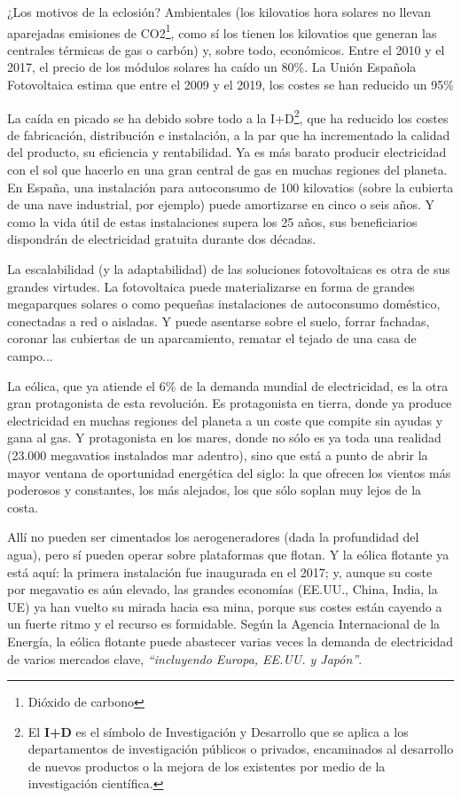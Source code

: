 \documentclass[12pt,letterpaper,superscriptaddress]{article}
\begin{document}
¿Los motivos de la eclosión? Ambientales (los kilovatios hora solares no llevan aparejadas emisiones de CO2\footnote{Dióxido de carbono}, como sí los tienen los kilovatios que generan las centrales térmicas de gas o carbón) y, sobre todo, económicos. Entre el 2010 y el 2017, el precio de los módulos solares ha caído un 80\%. La Unión Española Fotovoltaica estima que entre el 2009 y el 2019, los costes se han reducido un 95\%

La caída en picado se ha debido sobre todo a la I+D\footnote{El \textbf{I+D} es el símbolo de Investigación y Desarrollo que se aplica a los departamentos de investigación públicos o privados, encaminados al desarrollo de nuevos productos o la mejora de los existentes por medio de la investigación científica.}, que ha reducido los costes de fabricación, distribución e instalación, a la par que ha incrementado la calidad del producto, su eficiencia y rentabilidad. Ya es más barato producir electricidad con el sol que hacerlo en una gran central de gas en muchas regiones del planeta. En España, una instalación para autoconsumo de 100 kilovatios (sobre la cubierta de una nave industrial, por ejemplo) puede amortizarse en cinco o seis años. Y como la vida útil de estas instalaciones supera los 25 años, sus beneficiarios dispondrán de electricidad gratuita durante dos décadas.

La escalabilidad (y la adaptabilidad) de las soluciones fotovoltaicas es otra de sus grandes virtudes. La fotovoltaica puede materializarse en forma de grandes megaparques solares o como pequeñas instalaciones de autoconsumo doméstico, conectadas a red o aisladas. Y puede asentarse sobre el suelo, forrar fachadas, coronar las cubiertas de un aparcamiento, rematar el tejado de una casa de campo...

La eólica, que ya atiende el 6\% de la demanda mundial de electricidad, es la otra gran protagonista de esta revolución. Es protagonista en tierra, donde ya produce electricidad en muchas regiones del planeta a un coste que compite sin ayudas y gana al gas. Y protagonista en los mares, donde no sólo es ya toda una realidad (23.000 megavatios instalados mar adentro), sino que está a punto de abrir la mayor ventana de oportunidad energética del siglo: la que ofrecen los vientos más poderosos y constantes, los más alejados, los que sólo soplan muy lejos de la costa.

Allí no pueden ser cimentados los aerogeneradores (dada la profundidad del agua), pero sí pueden operar sobre plataformas que flotan. Y la eólica flotante ya está aquí: la primera instalación fue inaugurada en el 2017; y, aunque su coste por megavatio es aún elevado, las grandes economías (EE.UU., China, India, la UE) ya han vuelto su mirada hacia esa mina, porque sus costes están cayendo a un fuerte ritmo y el recurso es formidable. Según la Agencia Internacional de la Energía, la eólica flotante puede abastecer varias veces la demanda de electricidad de varios mercados clave, \emph{“incluyendo Europa, EE.UU. y Japón”}.
\end{document}
